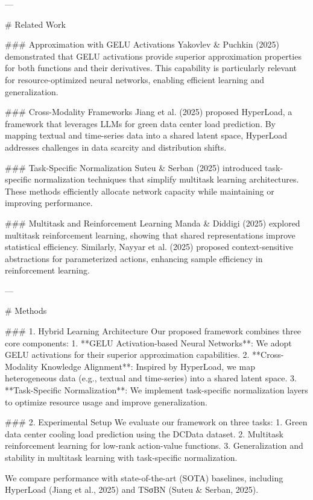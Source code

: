 ---

# Related Work  

### Approximation with GELU Activations  
Yakovlev & Puchkin (2025) demonstrated that GELU activations provide superior approximation properties for both functions and their derivatives. This capability is particularly relevant for resource-optimized neural networks, enabling efficient learning and generalization.

### Cross-Modality Frameworks  
Jiang et al. (2025) proposed HyperLoad, a framework that leverages LLMs for green data center load prediction. By mapping textual and time-series data into a shared latent space, HyperLoad addresses challenges in data scarcity and distribution shifts.

### Task-Specific Normalization  
Suteu & Serban (2025) introduced task-specific normalization techniques that simplify multitask learning architectures. These methods efficiently allocate network capacity while maintaining or improving performance.

### Multitask and Reinforcement Learning  
Manda & Diddigi (2025) explored multitask reinforcement learning, showing that shared representations improve statistical efficiency. Similarly, Nayyar et al. (2025) proposed context-sensitive abstractions for parameterized actions, enhancing sample efficiency in reinforcement learning.

---

# Methods  

### 1. Hybrid Learning Architecture  
Our proposed framework combines three core components:  
1. **GELU Activation-based Neural Networks**: We adopt GELU activations for their superior approximation capabilities.  
2. **Cross-Modality Knowledge Alignment**: Inspired by HyperLoad, we map heterogeneous data (e.g., textual and time-series) into a shared latent space.  
3. **Task-Specific Normalization**: We implement task-specific normalization layers to optimize resource usage and improve generalization.

### 2. Experimental Setup  
We evaluate our framework on three tasks:  
1. Green data center cooling load prediction using the DCData dataset.  
2. Multitask reinforcement learning for low-rank action-value functions.  
3. Generalization and stability in multitask learning with task-specific normalization.

We compare performance with state-of-the-art (SOTA) baselines, including HyperLoad (Jiang et al., 2025) and TSσBN (Suteu & Serban, 2025).


